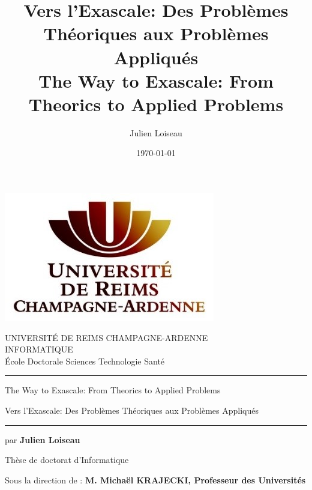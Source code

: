 \documentclass[10pt,a4paper]{book}
\title{Vers l'Exascale: Des Probl\`emes Th\'eoriques aux Probl\`emes Appliqu\'es\\
The Way to Exascale: From Theorics to Applied Problems}
\author{Julien Loiseau}
\date{\today}
\begin{document}
\thispagestyle{empty}

{%
\sffamily
\centering

{
\includegraphics[scale=1]{figures/style/logo_urca_front_page.jpg}
\vspace{0.5cm}
}

{
UNIVERSIT\'E DE REIMS CHAMPAGNE-ARDENNE\\
\vspace{0.5cm}
INFORMATIQUE\\
\vspace{0.5cm}
\'Ecole Doctorale Sciences Technologie Sant\'e
}

\vspace{1.0cm}
{\hrule height 2pt\vspace{2pt}}

\Large

{\huge 
\vspace{1cm}
The Way to Exascale: From Theorics to Applied Problems
}

{
\vspace{0.5cm}
Vers l'Exascale: Des Probl\`emes Th\'eoriques aux Probl\`emes Appliqu\'es\\
}

\vspace{1.0cm}
\hrule

\vspace{2.5cm}

{\LARGE
par \textbf{Julien Loiseau}
}

\vspace{2.5cm}

{
Th\`ese de doctorat d'Informatique
}

\vspace{2.5cm}

{
Sous la direction de : \textbf{M. Michaël KRAJECKI, Professeur des Universités}
}
\vspace{0.5cm}

\vspace{\fill}

}
\end{document}
